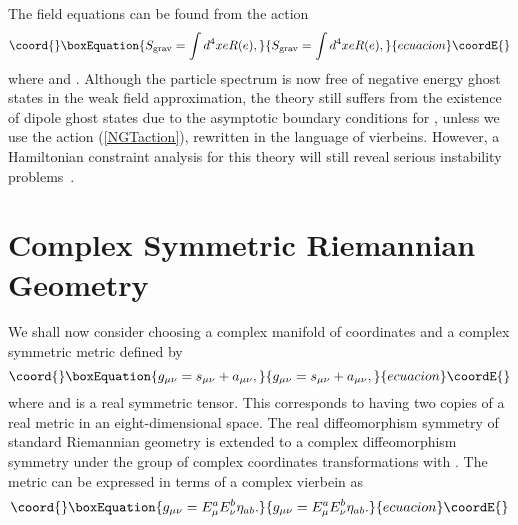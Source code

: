 \documentclass[a4paper,10pt]{article}
\begin{document}
The field equations can be found from the action~\cite{Moffat6,Moffat7}
\begin{equation}\coord{}\boxEquation{
S_{\rm grav}=\int d^4xeR(e),
}{
S_{\rm grav}=\int d^4xeR(e),
}{ecuacion}\coordE{}\end{equation}
where \coordHE{} and \coordHE{}.
Although the particle spectrum is now free of negative energy ghost states
in the weak field approximation, the theory still suffers from the
existence of dipole ghost states due to the asymptotic boundary conditions
for \coordHE{}, unless we use the action (\ref{NGTaction}),
rewritten in the language of vierbeins. However, a Hamiltonian
constraint analysis for this theory will still reveal serious
instability problems~\cite{Clayton,Clayton2}.

\section{Complex Symmetric Riemannian Geometry}

We shall now consider choosing a complex manifold of coordinates \coordHE{} and a complex symmetric metric defined
by~\cite{Moffat,Moffat2,Moffat3}
\begin{equation}\coord{}\boxEquation{
g_{\mu\nu}=s_{\mu\nu}+a_{\mu\nu},
}{
g_{\mu\nu}=s_{\mu\nu}+a_{\mu\nu},
}{ecuacion}\coordE{}\end{equation}
where \coordHE{} and \coordHE{} is a real symmetric
tensor. This corresponds to having two copies of a real metric in an
eight-dimensional space. The real diffeomorphism symmetry of standard
Riemannian geometry is extended to a complex diffeomorphism symmetry under
the group of complex coordinates transformations with \coordHE{}.
The metric can be expressed in terms of a complex vierbein \coordHE{} as
\begin{equation}\coord{}\boxEquation{
\label{complexvierbein}
g_{\mu\nu}=E^a_\mu E^b_\nu\eta_{ab}.
}{
g_{\mu\nu}=E^a_\mu E^b_\nu\eta_{ab}.
}{ecuacion}\coordE{}\end{equation}
\end{document}
